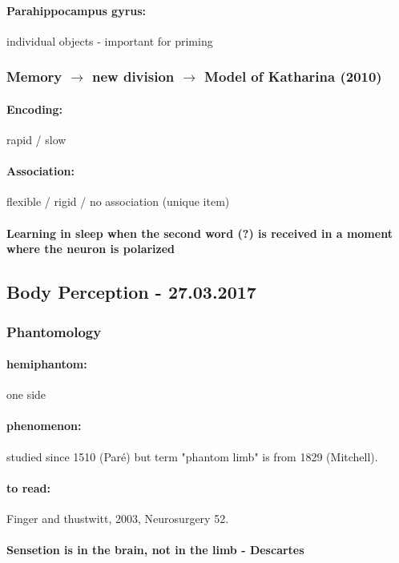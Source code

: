 \documentclass[12pt,article,oneside,a4paper]{memoir}
\begin{document}
\paragraph{Parahippocampus gyrus:} individual objects - important for priming

\subsubsection{Memory $\rightarrow$ new division $\rightarrow$ Model of Katharina (2010)}
\paragraph{Encoding:} rapid / slow
\paragraph{Association:} flexible / rigid / no association (unique item)
\paragraph{Learning in sleep when the second word (?) is received in a moment where the neuron is polarized}

\subsection{Body Perception - 27.03.2017}
\subsubsection{Phantomology}
\paragraph{hemiphantom:} one side
\paragraph{phenomenon:} studied since 1510 (Paré) but term "phantom limb" is from 1829 (Mitchell).
\paragraph{to read:} Finger and thustwitt, 2003, Neurosurgery 52.
\paragraph{Sensetion is in the brain, not in the limb - Descartes}
\end{document}
